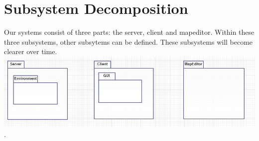 \section{Subsystem Decomposition}

Our systems consist of three parts: the server, client and \gls{mapeditor}.  Within these three subsystems, other subsytems can be defined. These subsystems will become clearer over time. \\

\includegraphics[width=\linewidth]{sub.png}.
